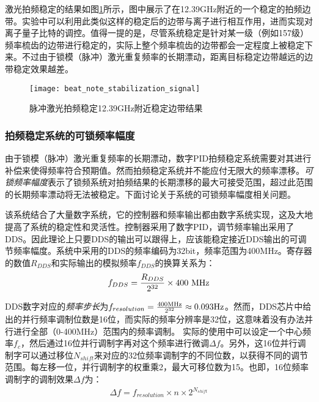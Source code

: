 激光拍频稳定的结果如图\ref{fig:beat_note_stabilization_signal}所示，图中展示了在12.39GHz附近的一个稳定的拍频边带。实验中可以利用此类似这样的稳定后的边带与离子进行相互作用，进而实现对离子量子比特的调控。值得一提的是，尽管系统稳定是针对某一级（例如157级）频率梳齿的边带进行稳定的，实际上整个频率梳齿的边带都会一定程度上被稳定下来。不过由于锁模（脉冲）激光重复频率的长期漂动，距离目标稳定边带越远的边带稳定效果越差。
\begin{figure}
    \centering
    \caption[脉冲激光拍频稳定12.39GHz附近稳定边带结果]{脉冲激光拍频稳定12.39GHz附近稳定边带结果\label{fig:beat_note_stabilization_signal}}
    \texttt{[image: beat\_note\_stabilization\_signal]}
\end{figure}

\subsubsection[拍频稳定系统的可锁频率幅度]{拍频稳定系统的可锁频率幅度}
由于锁模（脉冲）激光重复频率的长期漂动，数字PID拍频稳定系统需要对其进行补偿来使得频率符合预期值。然而拍频稳定系统并不能应付无限大的频率漂移。\emph{可锁频率幅度}表示了锁频系统对拍频结果的长期漂移的最大可接受范围，超过此范围的长期频率漂动将无法被稳定。下面讨论关于系统的可锁频率幅度相关问题。

该系统结合了大量数字系统，它的控制器和频率输出都由数字系统实现，这及大地提高了系统的稳定性和灵活性。控制器采用了数字PID，调节频率输出采用了DDS。因此理论上只要DDS的输出可以跟得上，应该能稳定接近DDS输出的可调节频率幅度。系统中采用的DDS的频率编码为32bit，频率范围为400MHz。寄存器的数值$R_{DDS}$和实际输出的模拟频率$f_{DDS}$的换算关系为：
\begin{align}
    f_{DDS}=\frac{R_{DDS}}{2^{32}}\times 400\ \textnormal{MHz}
\end{align}

DDS数字对应的\emph{频率步长}为$f_{resolution}=\frac{400\textnormal{MHz}}{2^{32}}\approx0.093\textnormal{Hz}$。然而，DDS芯片中给出的并行频率调制位数是16位，而实际的频率分辨率是32位，这意味着没有办法并行进行全部（0-400MHz）范围内的频率调制。
实际的使用中可以设定一个中心频率$f_{c}$，然后通过16位并行调制字再对这个频率进行微调$\Delta f$。另外，这16位并行调制字可以通过移位$N_{shift}$来对应的32位频率调制字的不同位数，以获得不同的调节范围。每左移一位，并行调制字的权重乘2，最大可移位数为15。也即，16位频率调制字的调制效果$\Delta f$为：
\begin{align}
    \Delta f=f_{resolution}\times n \times 2^{N_{shift}}
\end{align}

